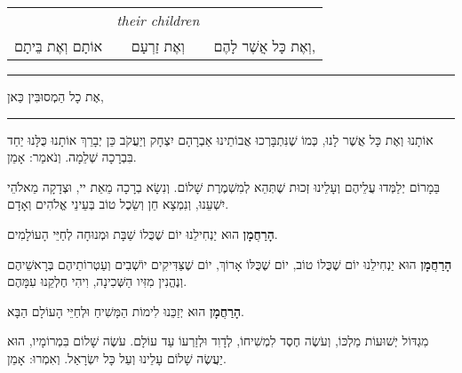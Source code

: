 \begin{tabular}{c c c}
	& \textenglish{\itshape their children}
		& \\
אוֹתָם וְאֶת בֵּיתָם & וְאֶת זַרְעָם & וְאֶת כָּל אֲשֶׁר לָהֶם, \\
\end{tabular}

\vspace{0.1em}
\hrule
\vspace{0.1em}


אֶת כָל הַמְסוּבִּין כַּאן,

\vspace{0.1em}
\hrule
\vspace{0.1em}


אוֹתָנוּ וְאֶת כָּל אֲשֶׁר לָנוּ, כְּמוֹ שֶׁנִּתְבָּרְכוּ אֲבוֹתֵינוּ אַבְרָהָם יִצְחָק וְיַעֲקֹב
כֵּן יְבָרֵךְ אוֹתָנוּ כֻּלָּנוּ יַחַד בִּבְרָכָה שְׁלֵמָה. וְנֹאמַר: אָמֵן.


\vspace{1em}


בַּמָרוֹם יְלַמְּדוּ עֲלֵיהֶם וְעָלֵינוּ זְכוּת שֶׁתְּהֵא לְמִשְׁמֶרֶת שָׁלוֹם. וְנִשָׂא בְרָכָה מֵאֵת יי, וּצְדָקָה מֵאלֹהֵי יִשְׁעֵנוּ, וְנִמְצָא חֵן וְשֵׂכֶל טוֹב בְּעֵינֵי אֱלֹהִים וְאָדָם.


\begin{center}

\begin{framed}

{\bf הָרַחֲמָן}
הוּא יַנְחִילֵנוּ יוֹם שֶׁכֻּלוֹ שַׁבָּת וּמְנוּחָה לְחַיֵּי הָעוֹלָמִים.
\end{framed}

{\bf הָרַחֲמָן}
הוּא יַנְחִילֵנוּ יוֹם שֶׁכֻּלוֹ טוֹב, יוֹם שֶׁכֻּלּוֹ אָרוֹךְ, יוֹם שֶׁצַּדִּיקִים יוֹשְׁבִים וְעַטְרוֹתֵיהֶם בְּרָאשֵׁיהֶם וְנֶהֱנִין מִזִּיו הַשְּׁכִינָה, וִיהִי חֶלְקֵנוּ עִמָּהֶם.

{\bf הָרַחֲמָן}
הוּא יְזַכֵּנוּ לִימוֹת הַמָּשִׁיחַ וּלְחַיֵּי הָעוֹלָם הַבָּא.
\end{center}

\vspace{1em}

מִגְדּוֹל יְשׁוּעוֹת מַלְכּוֹ, וְעֹשֶׂה חֶסֶד לִמְשִׁיחוֹ, לְדָוִד וּלְזַרְעוֹ עַד עוֹלָם. עֹשֶׂה שָׁלוֹם בִּמְרוֹמָיו, הוּא יַעֲשֶׂה שָׁלוֹם עָלֵינוּ וְעַל כָּל יִשְׂרָאַל. וְאִמְרוּ: אָמֵן.

